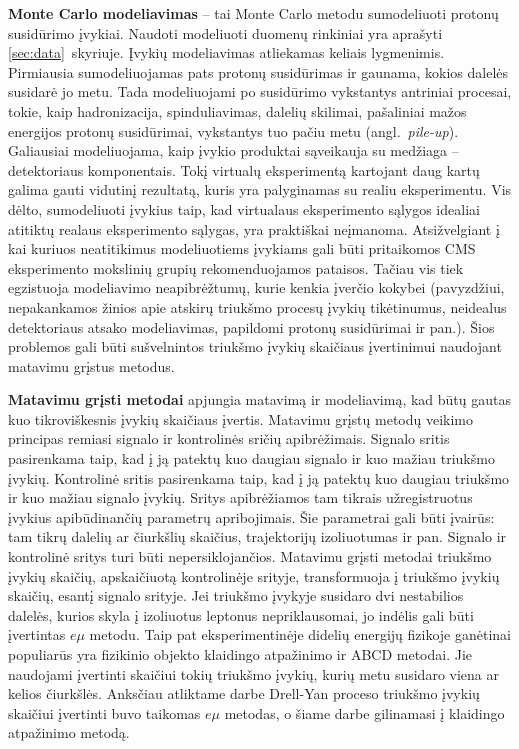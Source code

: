 \documentclass[a4paper, 12pt, oneside]{article}
\newcommand{\emu}{e\mu}
\begin{document}
\textbf{Monte Carlo modeliavimas} -- tai Monte Carlo metodu sumodeliuoti protonų susidūrimo įvykiai.
Naudoti modeliuoti duomenų rinkiniai yra aprašyti \ref{sec:data}~skyriuje.
Įvykių modeliavimas atliekamas keliais lygmenimis.
Pirmiausia sumodeliuojamas pats protonų susidūrimas ir gaunama, kokios dalelės susidarė jo metu.
Tada modeliuojami po susidūrimo vykstantys antriniai procesai, tokie, kaip hadronizacija, spinduliavimas, dalelių skilimai,
pašaliniai mažos energijos protonų susidūrimai, vykstantys tuo pačiu metu (angl.\ \textit{pile-up}).
Galiausiai modeliuojama, kaip įvykio produktai sąveikauja su medžiaga -- detektoriaus komponentais.
Tokį virtualų eksperimentą kartojant daug kartų galima gauti vidutinį rezultatą, kuris yra palyginamas su realiu eksperimentu.
Vis dėlto, sumodeliuoti įvykius taip, kad virtualaus eksperimento sąlygos idealiai atitiktų realaus eksperimento sąlygas,
yra praktiškai neįmanoma.
Atsižvelgiant į kai kuriuos neatitikimus modeliuotiems įvykiams gali būti pritaikomos CMS eksperimento mokslinių grupių
rekomenduojamos pataisos.
Tačiau vis tiek egzistuoja modeliavimo neapibrėžtumų, kurie kenkia įverčio kokybei (pavyzdžiui, nepakankamos žinios apie
atskirų triukšmo procesų įvykių tikėtinumus, neidealus detektoriaus atsako modeliavimas, papildomi protonų susidūrimai ir pan.).
Šios problemos gali būti sušvelnintos triukšmo įvykių skaičiaus įvertinimui naudojant matavimu grįstus metodus.

\textbf{Matavimu grįsti metodai} apjungia matavimą ir modeliavimą, kad būtų gautas kuo tikroviškesnis įvykių skaičiaus įvertis.
Matavimu grįstų metodų veikimo principas remiasi signalo ir kontrolinės sričių apibrėžimais.
Signalo sritis pasirenkama taip, kad į ją patektų kuo daugiau signalo ir kuo mažiau triukšmo įvykių.
Kontrolinė sritis pasirenkama taip, kad į ją patektų kuo daugiau triukšmo ir kuo mažiau signalo įvykių.
Sritys apibrėžiamos tam tikrais užregistruotus įvykius apibūdinančių parametrų apribojimais.
Šie parametrai gali būti įvairūs: tam tikrų dalelių ar čiurkšlių skaičius, trajektorijų izoliuotumas ir pan.
Signalo ir kontrolinė sritys turi būti nepersiklojančios.
Matavimu grįsti metodai triukšmo įvykių skaičių, apskaičiuotą kontrolinėje srityje, transformuoja į triukšmo įvykių skaičių,
esantį signalo srityje.
Jei triukšmo įvykyje susidaro dvi nestabilios dalelės, kurios skyla į izoliuotus leptonus nepriklausomai,
jo indėlis gali būti įvertintas $\emu$ metodu.
Taip pat eksperimentinėje didelių energijų fizikoje ganėtinai populiarūs yra fizikinio objekto klaidingo atpažinimo ir ABCD metodai.
Jie naudojami įvertinti skaičiui tokių triukšmo įvykių, kurių metu susidaro viena ar kelios čiurkšlės.
Anksčiau atliktame darbe Drell-Yan proceso triukšmo įvykių skaičiui įvertinti buvo taikomas $\emu$ metodas, o šiame darbe gilinamasi
į klaidingo atpažinimo metodą.
\end{document}
